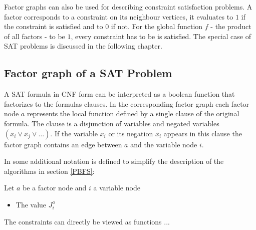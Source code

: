 \newpage
Factor graphs can also be used for describing constraint satisfaction problems. A factor corresponds to a constraint on its neighbour vertices, it evaluates to $1$ if the constraint is satisfied and to $0$ if not. For the global function $f$ - the product of all factors - to be $1$, every constraint has to be is satisfied. The special case of SAT problems is discussed in the following chapter.



\subsection{Factor graph of a SAT Problem}
A SAT formula in CNF form can be interpreted as a boolean function that factorizes to the formulas clauses. \newline
In the corresponding factor graph each factor node $a$ represents the local function defined by a single clause of the original formula. The clause is a disjunction of variables and negated variables $(x_i\lor \overline{x_j} \lor \ldots)$. If the variable $x_i$ or its negation $\overline{x_i}$ appears in this clause the factor graph contains an edge between $a$ and the variable node $i$.

In \cite{survprop} some additional notation is defined to simplify the description of the algorithms in section \ref{PBFS}: 
\begin{definition} Let $a$ be a factor node and $i$ a variable node
\begin{itemize}
\item The value $J_i^a$
\end{itemize}
\end{definition}
The constraints can directly be viewed as functions ...


